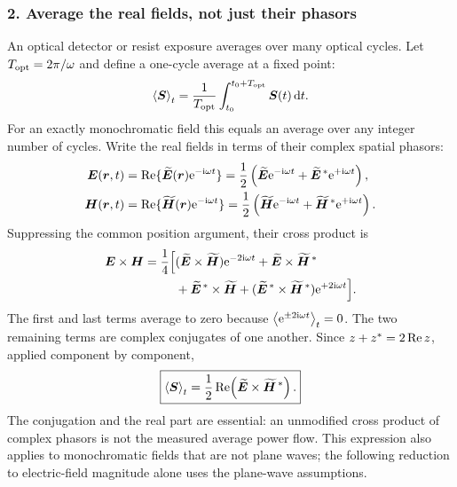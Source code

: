 \subsubsection*{2. Average the real fields, not just their phasors}
An optical detector or resist exposure averages over many optical cycles.
Let $T_{\rm opt}=2\pi/\omega$ and define a one-cycle average at a fixed point:
\[
\left\langle \bm{S}\right\rangle_t
=\frac{1}{T_{\rm opt}}\int_{t_0}^{t_0+T_{\rm opt}}\bm{S}(t)\,\mathrm{d} t.
\]
For an exactly monochromatic field this equals an average over any
integer number of cycles. Write the real fields in terms of their
complex spatial phasors:
\begin{align*}
\bm{E}(\bm{r},t)
&=\operatorname{Re}\{\widetilde{\bm{E}}(\bm{r})\mathrm{e}^{-\mathrm{i}\omega t}\}
=\frac12\left(
\widetilde{\bm{E}}\mathrm{e}^{-\mathrm{i}\omega t}
+\widetilde{\bm{E}}^{\,*}\mathrm{e}^{+\mathrm{i}\omega t}\right),\\
\bm{H}(\bm{r},t)
&=\operatorname{Re}\{\widetilde{\bm{H}}(\bm{r})\mathrm{e}^{-\mathrm{i}\omega t}\}
=\frac12\left(
\widetilde{\bm{H}}\mathrm{e}^{-\mathrm{i}\omega t}
+\widetilde{\bm{H}}^{\,*}\mathrm{e}^{+\mathrm{i}\omega t}\right).
\end{align*}
Suppressing the common position argument, their cross product is
\begin{align*}
\bm{E}\times\bm{H}
=\frac14\Bigl[&
(\widetilde{\bm{E}}\times\widetilde{\bm{H}})\mathrm{e}^{-2\mathrm{i}\omega t}
+\widetilde{\bm{E}}\times\widetilde{\bm{H}}^{\,*}\\
&+\widetilde{\bm{E}}^{\,*}\times\widetilde{\bm{H}}
+(\widetilde{\bm{E}}^{\,*}\times\widetilde{\bm{H}}^{\,*})
\mathrm{e}^{+2\mathrm{i}\omega t}\Bigr].
\end{align*}
The first and last terms average to zero because
$\left\langle \mathrm{e}^{\pm2\mathrm{i}\omega t}\right\rangle_t=0$.
The two remaining terms are complex conjugates of one another.
Since $z+z^*=2\operatorname{Re} z$, applied component by component,
\begin{equation}
\boxed{\left\langle \bm{S}\right\rangle_t
=\frac12\operatorname{Re}\!\left(
\widetilde{\bm{E}}\times\widetilde{\bm{H}}^{\,*}\right).}
\label{eq:poynting-average}
\end{equation}
The conjugation and the real part are essential: an unmodified cross
product of complex phasors is not the measured average power flow.
This expression also applies to monochromatic fields that are not plane
waves; the following reduction to electric-field magnitude alone uses
the plane-wave assumptions.

